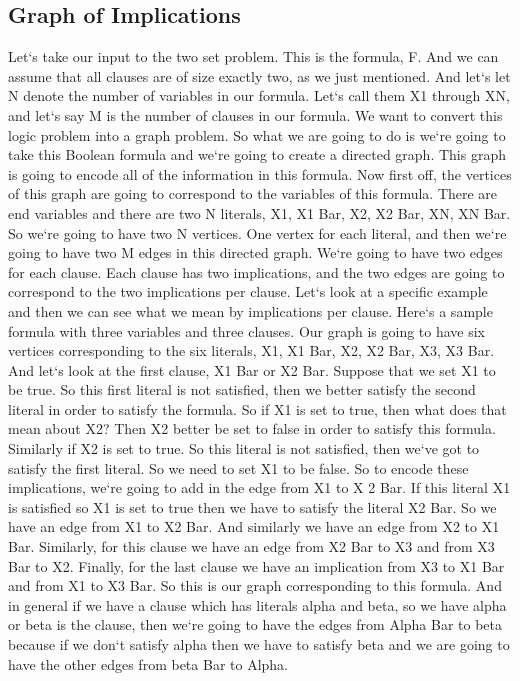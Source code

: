 \subsection{Graph of Implications}
Let`s take our input to the two set problem.
This is the formula, F\@.
And we can assume that all clauses are of size exactly two, as we just mentioned.
And let`s let N denote the number of variables in our formula.
Let`s call them X1 through XN, and let`s say M is the number of clauses in our formula.
We want to convert this logic problem into a graph problem.
So what we are going to do is we`re going to take this Boolean formula and we`re going to create a directed graph.
This graph is going to encode all of the information in this formula.
Now first off, the vertices of this graph are going to correspond to the variables of this formula.
There are end variables and there are two N literals, X1, X1 Bar, X2, X2 Bar, XN, XN Bar.
So we`re going to have two N vertices.
One vertex for each literal, and then we`re going to have two M edges in this directed graph.
We`re going to have two edges for each clause.
Each clause has two implications, and the two edges are going to correspond to the two implications per clause.
Let`s look at a specific example and then we can see what we mean by implications per clause.
Here`s a sample formula with three variables and three clauses.
Our graph is going to have six vertices corresponding to the six literals, X1, X1 Bar, X2, X2 Bar, X3, X3 Bar.
And let`s look at the first clause, X1 Bar or X2 Bar.
Suppose that we set X1 to be true.
So this first literal is not satisfied, then we better satisfy the second literal in order to satisfy the formula.
So if X1 is set to true, then what does that mean about X2? Then X2 better be set to false in order to satisfy this formula.
Similarly if X2 is set to true.
So this literal is not satisfied, then we`ve got to satisfy the first literal.
So we need to set X1 to be false.
So to encode these implications, we`re going to add in the edge from X1 to X 2 Bar.
If this literal X1 is satisfied so X1 is set to true then we have to satisfy the literal X2 Bar.
So we have an edge from X1 to X2 Bar.
And similarly we have an edge from X2 to X1 Bar.
Similarly, for this clause we have an edge from X2 Bar to X3 and from X3 Bar to X2.
Finally, for the last clause we have an implication from X3 to X1 Bar and from X1 to X3 Bar.
So this is our graph corresponding to this formula.
And in general if we have a clause which has literals alpha and beta, so we have alpha or beta is the clause, then we`re going to have the edges from Alpha Bar to beta because if we don`t satisfy alpha then we have to satisfy beta and we are going to have the other edges from beta Bar to Alpha.

